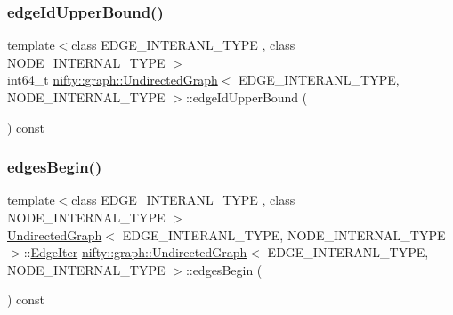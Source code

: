 \mbox{\label{classnifty_1_1graph_1_1UndirectedGraph_a7f8d1e94b073910e57f53e57905f7877}} 
\subsubsection{\texorpdfstring{edge\+Id\+Upper\+Bound()}{edgeIdUpperBound()}}
{\footnotesize\ttfamily template$<$class E\+D\+G\+E\+\_\+\+I\+N\+T\+E\+R\+A\+N\+L\+\_\+\+T\+Y\+PE , class N\+O\+D\+E\+\_\+\+I\+N\+T\+E\+R\+N\+A\+L\+\_\+\+T\+Y\+PE $>$ \\
int64\+\_\+t \hyperlink{classnifty_1_1graph_1_1UndirectedGraph}{nifty\+::graph\+::\+Undirected\+Graph}$<$ E\+D\+G\+E\+\_\+\+I\+N\+T\+E\+R\+A\+N\+L\+\_\+\+T\+Y\+PE, N\+O\+D\+E\+\_\+\+I\+N\+T\+E\+R\+N\+A\+L\+\_\+\+T\+Y\+PE $>$\+::edge\+Id\+Upper\+Bound (\begin{DoxyParamCaption}{ }\end{DoxyParamCaption}) const}

\mbox{\label{classnifty_1_1graph_1_1UndirectedGraph_a9cd92ddc55ce257585e3b1c34921292b}} 
\subsubsection{\texorpdfstring{edges\+Begin()}{edgesBegin()}}
{\footnotesize\ttfamily template$<$class E\+D\+G\+E\+\_\+\+I\+N\+T\+E\+R\+A\+N\+L\+\_\+\+T\+Y\+PE , class N\+O\+D\+E\+\_\+\+I\+N\+T\+E\+R\+N\+A\+L\+\_\+\+T\+Y\+PE $>$ \\
\hyperlink{classnifty_1_1graph_1_1UndirectedGraph}{Undirected\+Graph}$<$ E\+D\+G\+E\+\_\+\+I\+N\+T\+E\+R\+A\+N\+L\+\_\+\+T\+Y\+PE, N\+O\+D\+E\+\_\+\+I\+N\+T\+E\+R\+N\+A\+L\+\_\+\+T\+Y\+PE $>$\+::\hyperlink{classnifty_1_1graph_1_1UndirectedGraph_aa37a0dc690ad1257d5eb5105e7d66bba}{Edge\+Iter} \hyperlink{classnifty_1_1graph_1_1UndirectedGraph}{nifty\+::graph\+::\+Undirected\+Graph}$<$ E\+D\+G\+E\+\_\+\+I\+N\+T\+E\+R\+A\+N\+L\+\_\+\+T\+Y\+PE, N\+O\+D\+E\+\_\+\+I\+N\+T\+E\+R\+N\+A\+L\+\_\+\+T\+Y\+PE $>$\+::edges\+Begin (\begin{DoxyParamCaption}{ }\end{DoxyParamCaption}) const}

